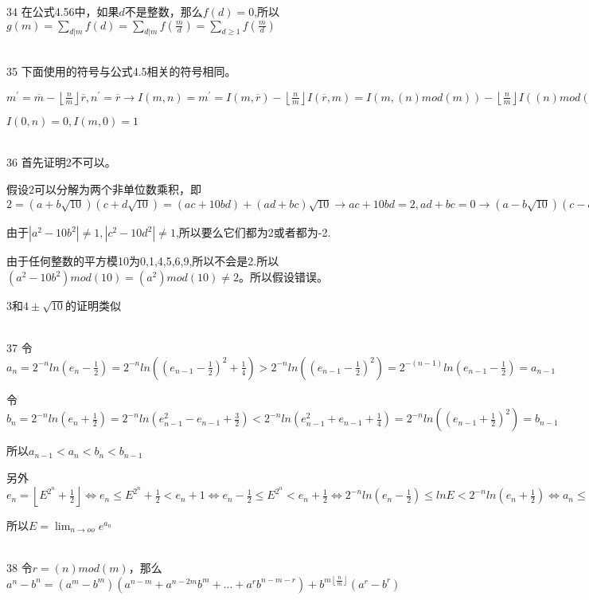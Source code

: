 \documentclass[onecolumn]{article}
\begin{document}
34 在公式4.56中，如果$d$不是整数，那么$f(d)=0$,所以$g(m)=\sum_{d|m}f(d)=\sum_{d|m}f(\frac{m}{d})=\sum_{d\geq 1}f(\frac{m}{d})$ \par
~\\
35 下面使用的符号与公式4.5相关的符号相同。 \par
$m^{'}=\overline{m}-\left \lfloor \frac{n}{m} \right \rfloor\overline{r},n^{'}=\overline{r}\rightarrow I(m,n)=m^{'}=I(m,\overline{r})-\left \lfloor \frac{n}{m} \right \rfloor I(\overline{r},m)=I(m,(n)mod(m))-\left \lfloor \frac{n}{m} \right \rfloor I((n)mod(m),m),I(n,m)=n^{'}=(n)mod(m)$ \par
$I(0,n)=0,I(m,0)=1$ \par
~\\
36 首先证明2不可以。\par
假设2可以分解为两个非单位数乘积，即$2=(a+b\sqrt{10})(c+d\sqrt{10})=(ac+10bd)+(ad+bc)\sqrt{10}\rightarrow ac+10bd=2,ad+bc=0\rightarrow (a-b\sqrt{10})(c-d\sqrt{10})=(ac+10bd)-(ad+bc)\sqrt{10}=2\rightarrow (a^{2}-10b^{2})(c^{2}-10d^{2})=4$\par
由于$|a^{2}-10b^{2}|\neq 1,|c^{2}-10d^{2}|\neq 1$,所以要么它们都为2或者都为-2. \par 由于任何整数的平方模10为0,1,4,5,6,9,所以不会是2.所以$(a^{2}-10b^{2})mod(10)=(a^{2})mod(10)\neq 2$。所以假设错误。\par
3和$4\pm \sqrt{10}$的证明类似\par
~\\
37 令$a_{n}=2^{-n}ln(e_{n}-\frac{1}{2})=2^{-n}ln((e_{n-1}-\frac{1}{2})^{2}+\frac{1}{4})>2^{-n}ln((e_{n-1}-\frac{1}{2})^{2})=2^{-(n-1)}ln(e_{n-1}-\frac{1}{2})=a_{n-1}$ \par
令$b_{n}=2^{-n}ln(e_{n}+\frac{1}{2})=2^{-n}ln(e_{n-1}^{2}-e_{n-1}+\frac{3}{2})<2^{-n}ln(e_{n-1}^{2}+e_{n-1}+\frac{1}{4})=2^{-n}ln((e_{n-1}+\frac{1}{2})^{2})=b_{n-1}$ \par
所以$a_{n-1}<a_{n}<b_{n}<b_{n-1}$ \par
另外$e_{n}=\left \lfloor E^{2^{n}}+\frac{1}{2} \right \rfloor\Leftrightarrow e_{n}\leq E^{2^{n}}+\frac{1}{2}<e_{n}+1\Leftrightarrow e_{n}-\frac{1}{2}\leq E^{2^{n}}<e_{n}+\frac{1}{2}\Leftrightarrow 2^{-n}ln(e_{n}-\frac{1}{2})\leq lnE<2^{-n}ln(e_{n}+\frac{1}{2})\Leftrightarrow a_{n}\leq lnE<b_{n}$ \par
所以$E=\lim_{n\rightarrow oo}e^{a_{n}}$ \par
~\\
38 令$r=(n)mod(m)$，那么$a^{n}-b^{n}=(a^{m}-b^{m})(a^{n-m}+a^{n-2m}b^{m}+...+a^{r}b^{n-m-r})+b^{m\left \lfloor \frac{n}{m} \right \rfloor}(a^{r}-b^{r})$ \par
\end{document}
